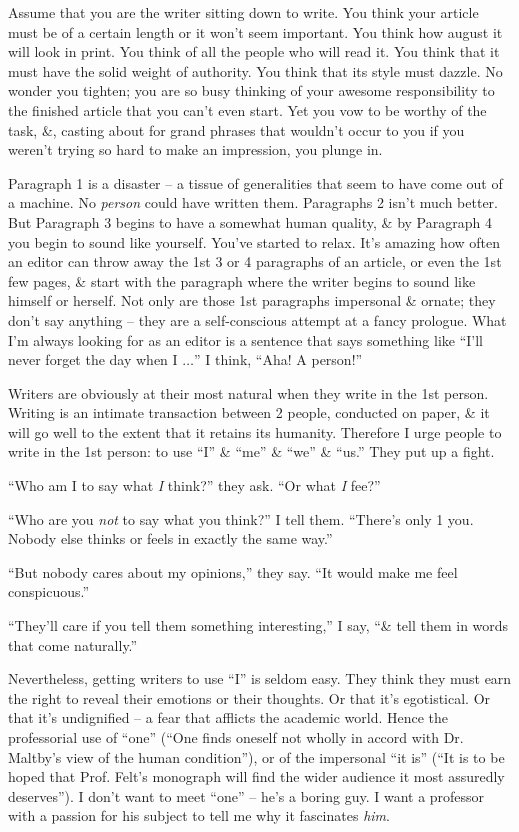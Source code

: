 \documentclass{article}
\begin{document}
Assume that you are the writer sitting down to write. You think your article must be of a certain length or it won't seem important. You think how august it will look in print. You think of all the people who will read it. You think that it must have the solid weight of authority. You think that its style must dazzle. No wonder you tighten; you are so busy thinking of your awesome responsibility to the finished article that you can't even start. Yet you vow to be worthy of the task, \&, casting about for grand phrases that wouldn't occur to you if you weren't trying so hard to make an impression, you plunge in.

Paragraph 1 is a disaster -- a tissue of generalities that seem to have come out of a machine. No \textit{person} could have written them. Paragraphs 2 isn't much better. But Paragraph 3 begins to have a somewhat human quality, \& by Paragraph 4 you begin to sound like yourself. You've started to relax. It's amazing how often an editor can throw away the 1st 3 or 4 paragraphs of an article, or even the 1st few pages, \& start with the paragraph where the writer begins to sound like himself or herself. Not only are those 1st paragraphs impersonal \& ornate; they don't say anything -- they are a self-conscious attempt at a fancy prologue. What I'm always looking for as an editor is a sentence that says something like ``I'll never forget the day when I $\ldots$'' I think, ``Aha! A person!''

Writers are obviously at their most natural when they write in the 1st person. Writing is an intimate transaction between 2 people, conducted on paper, \& it will go well to the extent that it retains its humanity. Therefore I urge people to write in the 1st person: to use ``I'' \& ``me'' \& ``we'' \& ``us.'' They put up a fight.

``Who am I to say what \textit{I} think?'' they ask. ``Or what \textit{I} fee?''

``Who are you \textit{not} to say what you think?'' I tell them. ``There's only 1 you. Nobody else thinks or feels in exactly the same way.''

``But nobody cares about my opinions,'' they say. ``It would make me feel conspicuous.''

``They'll care if you tell them something interesting,'' I say, ``\& tell them in words that come naturally.''

Nevertheless, getting writers to use ``I'' is seldom easy. They think they must earn the right to reveal their emotions or their thoughts. Or that it's egotistical. Or that it's undignified -- a fear that afflicts the academic world. Hence the professorial use of ``one'' (``One finds oneself not wholly in accord with Dr. Maltby's view of the human condition''), or of the impersonal ``it is'' (``It is to be hoped that Prof. Felt's monograph will find the wider audience it most assuredly deserves''). I don't want to meet ``one'' -- he's a boring guy. I want a professor with a passion for his subject to tell me why it fascinates \textit{him}.
\end{document}
